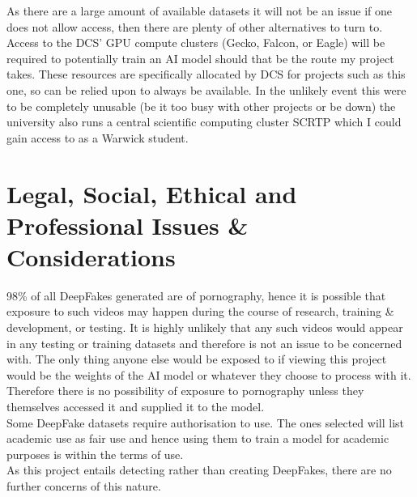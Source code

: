 As there are a large amount of available datasets it will not be an issue if one does not allow access, then there are plenty of other alternatives to turn to.\\

Access to the DCS' GPU compute clusters (Gecko, Falcon, or Eagle) will be required to potentially train an AI model should that be the route my project takes. These resources are specifically allocated by DCS for projects such as this one, so can be relied upon to always be available. In the unlikely event this were to be completely unusable (be it too busy with other projects or be down) the university also runs a central scientific computing cluster SCRTP which I could gain access to as a Warwick student.


\section{Legal, Social, Ethical and Professional Issues \& Considerations}
98\% of all DeepFakes generated are of pornography\cite{pornography}, hence it is possible that exposure to such videos may happen during the course of research, training \& development, or testing. It is highly unlikely that any such videos would appear in any testing or training datasets and therefore is not an issue to be concerned with. The only thing anyone else would be exposed to if viewing this project would be the weights of the AI model or whatever they choose to process with it. Therefore there is no possibility of exposure to pornography unless they themselves accessed it and supplied it to the model. \\

Some DeepFake datasets require authorisation to use. The ones selected will list academic use as fair use and hence using them to train a model for academic purposes is within the terms of use.\\

As this project entails detecting rather than creating DeepFakes, there are no further concerns of this nature.


